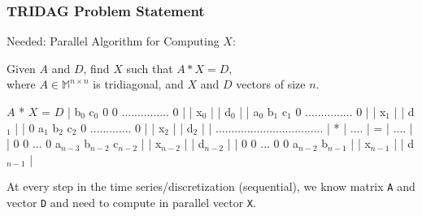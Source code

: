 \documentclass{beamer}
\renewcommand{\emph}[1]{\textcolor{structure}{#1}}
\newcommand{\emp}[1]{\textcolor{DikuRed}{ #1}}
\newcommand{\mymath}[1]{$ #1 $}
\newcommand{\myindx}[1]{_{#1}}
\begin{document}
\begin{frame}[fragile,t]
  \frametitle{TRIDAG Problem Statement}

\begin{block}{Needed: Parallel Algorithm for Computing $X$:} 

Given $A$ and $D$, find $X$ such that \emp{$A * X = D$}, \\
       where $A \in \mathbb{M}^{n \times n}$ is \emph{tridiagonal}, and $X$ and $D$ vectors of size $n$.

\begin{colorcode}[fontsize=\scriptsize]
                   \emp{\mymath{A}                   *    \mymath{X}     =    \mymath{D}}
 | b\mymath{\myindx{0}}  c\mymath{\myindx{0}}  0   0    ............... 0 |   | x\mymath{\myindx{0}}   |   | d\mymath{\myindx{0}}   |
 | a\mymath{\myindx{0}}  b\mymath{\myindx{1}}  c\mymath{\myindx{1}}  0    ............... 0 |   | x\mymath{\myindx{1}}   |   | d\mymath{\myindx{1}}   |
 | 0   a\mymath{\myindx{1}}  b\mymath{\myindx{2}}  c\mymath{\myindx{2}}  0  ............. 0 |   | x\mymath{\myindx{2}}   |   | d\mymath{\myindx{2}}   |
 | .................................. | * | .... | = | .... |
 | 0    0  ...    0    a\mymath{\myindx{n-3}} b\mymath{\myindx{n-2}} c\mymath{\myindx{n-2}} |   | x\mymath{\myindx{n-2}} |   | d\mymath{\myindx{n-2}} |
 | 0    0  ...    0    0    a\mymath{\myindx{n-2}} b\mymath{\myindx{n-1}} |   | x\mymath{\myindx{n-1}} |   | d\mymath{\myindx{n-1}} |

\end{colorcode}
\end{block}

At every step in the time series/discretization (sequential), we know matrix {\tt A} and
vector {\tt D} and need to compute in parallel vector {\tt X}.

\end{frame}
\end{document}
